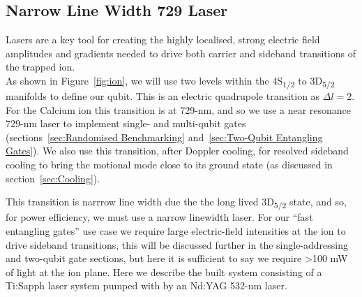     
\subsection{Narrow Line Width 729 Laser}
\label{sec:Narrow Line Width 729 Laser} 

    Lasers are a key tool for creating the highly localised, strong electric
    field amplitudes and gradients needed to drive both carrier and sideband
    transitions of the trapped ion.\\ As shown in Figure~\ref{fig:ion}, we will
    use two levels within the 4S\textsubscript{1/2} to 3D\textsubscript{5/2}
    manifolds to define our qubit. This is an electric quadrupole transition as
    $\Delta l = 2$.  For the Calcium ion this transition is at 729-nm, and so we
    use a near resonance 729-nm laser to implement single- and multi-qubit gates
    (sections~\ref{sec:Randomised Benchmarking} and~\ref{sec:Two-Qubit
    Entangling Gates}). We also use this transition, after Doppler cooling, for
    resolved sideband cooling to bring the motional mode close to its ground
    state (as discussed in section~\ref{sec:Cooling}).

    This transition is narrrow line width due the the long lived
    3D\textsubscript{5/2} state, and so, for power efficiency, we must use a
    narrow linewidth laser. For our ``fast entangling gates'' use case we
    require large electric-field intensities at the ion to drive sideband
    transitions, this will be discussed further in the single-addressing and
    two-qubit gate sections, but here it is sufficient to say we require >100 mW
    of light at the ion plane.  Here we describe the built system 
    consisting of a Ti:Sapph laser system pumped with by an Nd:YAG 532-nm laser.\\

